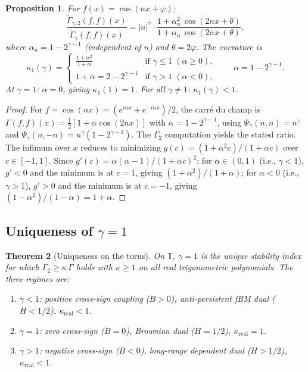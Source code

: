 \documentclass[11pt,a4paper]{article}
\theoremstyle{plain}
\newtheorem{theorem}{Theorem}[section]
\newtheorem{proposition}[theorem]{Proposition}
\theoremstyle{definition}
\theoremstyle{remark}
\newcommand{\T}{\mathbb{T}}
\begin{document}
\begin{proposition}\label{prop:single-mode}
For $f(x) = \cos(nx + \varphi)$:
\begin{equation}\label{eq:single-mode}
  \frac{\widetilde{\Gamma}_{\gamma,2}(f,f)(x)}
       {\widetilde{\Gamma}_\gamma(f,f)(x)}
  = |n|^\gamma \cdot
  \frac{1 + \alpha_n^2\,\cos(2nx+\theta)}
       {1 + \alpha_n\,\cos(2nx+\theta)},
\end{equation}
where $\alpha_n = 1 - 2^{\gamma-1}$ (independent of $n$)
and $\theta = 2\varphi$. The curvature is
\begin{equation}\label{eq:kappa1}
  \kappa_1(\gamma) =
  \begin{cases}
    \displaystyle\frac{1 + \alpha^2}{1 + \alpha}
    & \text{if } \gamma \leq 1 \;(\alpha \geq 0), \\[6pt]
    1 + \alpha = 2 - 2^{\gamma-1}
    & \text{if } \gamma > 1 \;(\alpha < 0),
  \end{cases}
  \qquad \alpha = 1 - 2^{\gamma-1}.
\end{equation}
At $\gamma = 1$: $\alpha = 0$, giving $\kappa_1(1) = 1$.
For all $\gamma \neq 1$: $\kappa_1(\gamma) < 1$.
\end{proposition}

\begin{proof}
For $f = \cos(nx) = (e^{inx} + e^{-inx})/2$, the carr\'e du champ is
$\Gamma(f,f)(x) = \tfrac{1}{2}[1 + \alpha\cos(2nx)]$
with $\alpha = 1 - 2^{\gamma-1}$,
using $\Psi_\gamma(n,n) = n^\gamma$ and
$\Psi_\gamma(n,-n) = n^\gamma(1 - 2^{\gamma-1})$.
The $\Gamma_2$ computation yields the stated ratio.
The infimum over $x$ reduces to minimizing
$g(c) = (1 + \alpha^2 c)/(1 + \alpha c)$ over $c \in [-1,1]$.
Since $g'(c) = \alpha(\alpha - 1)/(1+\alpha c)^2$:
for $\alpha \in (0,1)$ (i.e., $\gamma < 1$), $g' < 0$ and the
minimum is at $c = 1$, giving $(1+\alpha^2)/(1+\alpha)$;
for $\alpha < 0$ (i.e., $\gamma > 1$), $g' > 0$ and the
minimum is at $c = -1$, giving $(1-\alpha^2)/(1-\alpha) = 1+\alpha$.
\end{proof}


\subsection{Uniqueness of $\gamma = 1$}

\begin{theorem}[Uniqueness on the torus]\label{thm:uniqueness}
On $\T$, $\gamma = 1$ is the unique stability index for which
$\Gamma_2 \geq \kappa\,\Gamma$ holds with $\kappa \geq 1$
on all real trigonometric polynomials. The three regimes are:
\begin{enumerate}[label=(\roman*)]
\item $\gamma < 1$: positive cross-sign coupling ($B > 0$),
  anti-persistent fBM dual ($H < 1/2$), $\kappa_{\mathrm{real}} < 1$.
\item $\gamma = 1$: zero cross-sign ($B = 0$),
  Brownian dual ($H = 1/2$), $\kappa_{\mathrm{real}} = 1$.
\item $\gamma > 1$: negative cross-sign ($B < 0$),
  long-range dependent dual ($H > 1/2$), $\kappa_{\mathrm{real}} < 1$.
\end{enumerate}
\end{theorem}
\end{document}
